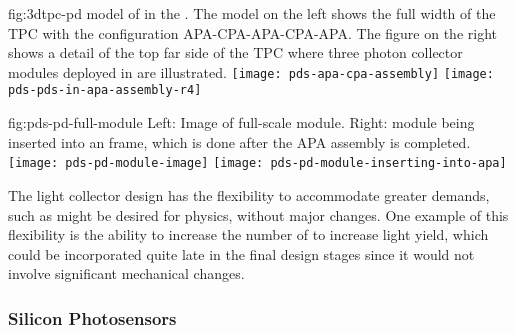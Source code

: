 




\begin{dunefigure}{fig:3dtpc-pd}
{\threed model of  in the . The model on the left shows the full width of the TPC with the configuration APA-CPA-APA-CPA-APA. The figure on the right shows a detail of the top far side of the TPC where three photon collector modules deployed in  are illustrated.}
\texttt{[image: pds-apa-cpa-assembly]}
\texttt{[image: pds-pds-in-apa-assembly-r4]}
\end{dunefigure}

\begin{dunefigure}{fig:pds-pd-full-module}
{Left: Image of full-scale  module.  Right:  module being inserted into an  frame, which is done after the APA assembly is completed.}
\texttt{[image: pds-pd-module-image]}
\hspace{0.01\textwidth}
\texttt{[image: pds-pd-module-inserting-into-apa]}
\end{dunefigure}



The  light collector design has the flexibility to accommodate greater demands, such as might be desired for  physics, without major changes. One example of this flexibility is the ability to increase the number of  to increase light yield, which could be incorporated quite late in the final design stages since it would not involve significant mechanical changes.

\subsubsection{Silicon Photosensors} 
\label{sssec:photosensors}

